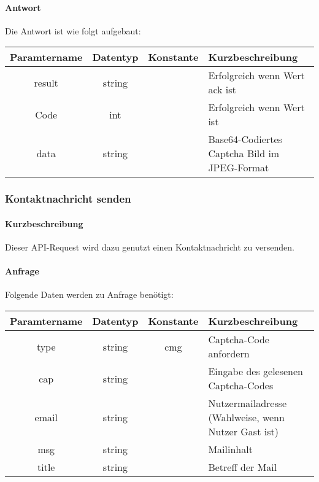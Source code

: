 \paragraph{Antwort}Die Antwort ist wie folgt aufgebaut:
\begin{table}[H]
	\begin{tabular}{|c|c|c|p{6.5cm}|}
		\hline
		\textbf{Paramtername} & \textbf{Datentyp} & \textbf{Konstante} & \textbf{Kurzbeschreibung}                                                                                               \\ \hline
		result              & string           &                 & Erfolgreich wenn Wert {\glqq ack\grqq} ist \\ \hline
		Code                & int              &                 & Erfolgreich wenn Wert {\glqq 0\grqq} ist \\ \hline
		data                & string           &                 & Base64-Codiertes Captcha Bild im JPEG-Format \\ \hline
	\end{tabular}
\end{table}

\subsubsection{Kontaktnachricht senden}
\paragraph{Kurzbeschreibung}Dieser API-Request wird dazu genutzt einen Kontaktnachricht zu versenden.
\paragraph{Anfrage}Folgende Daten werden zu Anfrage benötigt:
\begin{table}[H]
	\begin{tabular}{|c|c|c|p{6.5cm}|}
		\hline
		\textbf{Paramtername} & \textbf{Datentyp} & \textbf{Konstante} & \textbf{Kurzbeschreibung}                                                                                               \\ \hline
		type                & string            & cmg                & Captcha-Code anfordern \\ \hline
		cap                 & string            &                    & Eingabe des gelesenen Captcha-Codes \\ \hline
		email               & string            &                    & Nutzermailadresse (Wahlweise, wenn Nutzer Gast ist) \\ \hline
		msg                 & string            &                    & Mailinhalt \\ \hline
		title               & string            &                    & Betreff der Mail \\ \hline
	\end{tabular}
\end{table}
